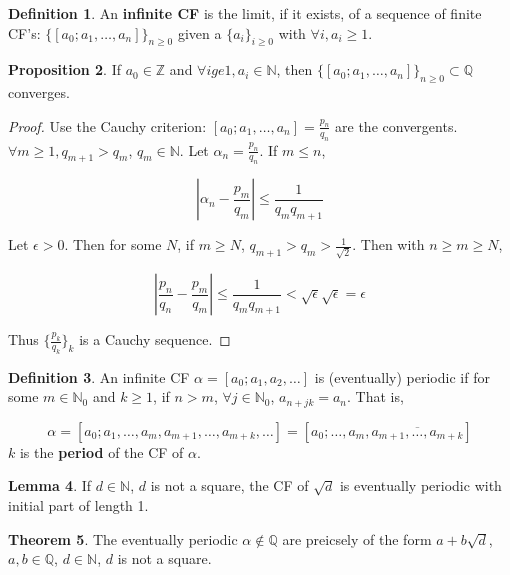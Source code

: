 \documentclass[12pt,a4paper]{article}
\theoremstyle{definition}
\newtheorem{definition}{Definition}[subsection]
\newtheorem{theorem}[definition]{Theorem}
\newtheorem{proposition}[definition]{Proposition}
\newtheorem{lemma}[definition]{Lemma}
\begin{document}
\begin{definition}
	An \textbf{infinite CF} is the limit, if it exists, of a sequence of finite CF's: $\{[a_0; a_1, \ldots, a_n]\}_{n \ge 0}$ given a $\{a_i\}_{i \ge 0}$ with $\forall i, a_i \ge 1$.
\end{definition}

\begin{proposition}
	If $a_0 \in \mathbb{Z}$ and $\forall i ge 1, a_i \in \mathbb{N}$, then $\{[a_0; a_1, \ldots, a_n]\}_{n \ge 0} \subset \mathbb{Q}$ converges.
\end{proposition}

\begin{proof}
	Use the Cauchy criterion: $[a_0; a_1, \ldots, a_n] = \frac{p_n}{q_n}$ are the convergents. $\forall m \ge 1, q_{m + 1} > q_m$, $q_m \in \mathbb{N}$. Let $\alpha_n = \frac{p_n}{q_n}$. If $m \le n$,

	\[ \left| \alpha_n - \frac{p_m}{q_m} \right| \le \frac{1}{q_m q_{m + 1}} \]

	Let $\epsilon > 0$. Then for some $N$, if $m \ge N$, $q_{m + 1} > q_m > \frac{1}{\sqrt{2}}$. Then with $n \ge m \ge N$,

	\[ \left| \frac{p_n}{q_n} - \frac{p_m}{q_m} \right| \le \frac{1}{q_m q_{m + 1}} < \sqrt{\epsilon} \sqrt{\epsilon} = \epsilon \]

	Thus $\{ \frac{p_k}{q_k} \}_k$ is a Cauchy sequence.
\end{proof}

\begin{definition}
	An infinite CF $\alpha = [a_0; a_1, a_2, \ldots]$ is (eventually) periodic if for some $m \in \mathbb{N}_0$ and $k \ge 1$, if $n > m$, $\forall j \in \mathbb{N}_0$, $a_{n + jk} = a_n$. That is,

	\[ \alpha = [a_0; a_1, \ldots, a_m, a_{m + 1}, \ldots, a_{m + k}, \ldots] = [a_0; \ldots, a_m, \overline{a_{m + 1}, \ldots, a_{m + k}}] \]
	$k$ is the \textbf{period} of the CF of $\alpha$.
\end{definition}

\begin{lemma}
	If $d \in \mathbb{N}$, $d$ is not a square, the CF of $\sqrt{d}$ is eventually periodic with initial part of length 1.
\end{lemma}

\begin{theorem}
	The eventually periodic $\alpha \notin \mathbb{Q}$ are preicsely of the form $a + b \sqrt{d}$, $a, b \in \mathbb{Q}$, $d \in \mathbb{N}$, $d$ is not a square.
\end{theorem}
\end{document}
